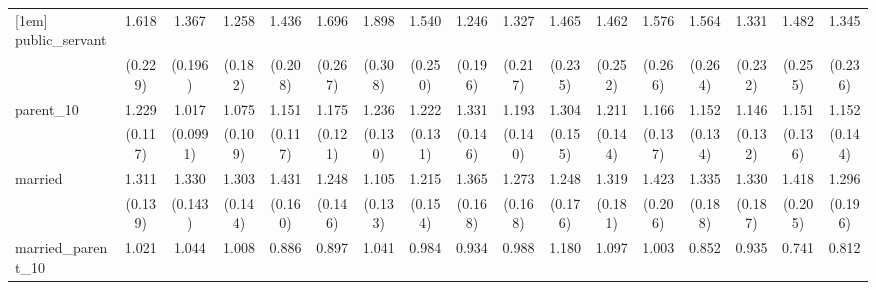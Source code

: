 {\begin{tabular}{l*{16}{c}}
[1em]
public\_servant      &       1.618\sym{***}&       1.367\sym{*}  &       1.258         &       1.436\sym{*}  &       1.696\sym{***}&       1.898\sym{***}&       1.540\sym{**} &       1.246         &       1.327         &       1.465\sym{*}  &       1.462\sym{*}  &       1.576\sym{**} &       1.564\sym{**} &       1.331         &       1.482\sym{*}  &       1.345         \\
                    &     (0.229)         &     (0.196)         &     (0.182)         &     (0.208)         &     (0.267)         &     (0.308)         &     (0.250)         &     (0.196)         &     (0.217)         &     (0.235)         &     (0.252)         &     (0.266)         &     (0.264)         &     (0.232)         &     (0.255)         &     (0.236)         \\
[1em]
parent\_10           &       1.229\sym{*}  &       1.017         &       1.075         &       1.151         &       1.175         &       1.236\sym{*}  &       1.222         &       1.331\sym{**} &       1.193         &       1.304\sym{*}  &       1.211         &       1.166         &       1.152         &       1.146         &       1.151         &       1.152         \\
                    &     (0.117)         &    (0.0991)         &     (0.109)         &     (0.117)         &     (0.121)         &     (0.130)         &     (0.131)         &     (0.146)         &     (0.140)         &     (0.155)         &     (0.144)         &     (0.137)         &     (0.134)         &     (0.132)         &     (0.136)         &     (0.144)         \\
[1em]
married             &       1.311\sym{*}  &       1.330\sym{**} &       1.303\sym{*}  &       1.431\sym{**} &       1.248         &       1.105         &       1.215         &       1.365\sym{*}  &       1.273         &       1.248         &       1.319\sym{*}  &       1.423\sym{*}  &       1.335\sym{*}  &       1.330\sym{*}  &       1.418\sym{*}  &       1.296         \\
                    &     (0.139)         &     (0.143)         &     (0.144)         &     (0.160)         &     (0.146)         &     (0.133)         &     (0.154)         &     (0.168)         &     (0.168)         &     (0.176)         &     (0.181)         &     (0.206)         &     (0.188)         &     (0.187)         &     (0.205)         &     (0.196)         \\
[1em]
married\_parent\_10   &       1.021         &       1.044         &       1.008         &       0.886         &       0.897         &       1.041         &       0.984         &       0.934         &       0.988         &       1.180         &       1.097         &       1.003         &       0.852         &       0.935         &       0.741         &       0.812         \\

\end{tabular}}

